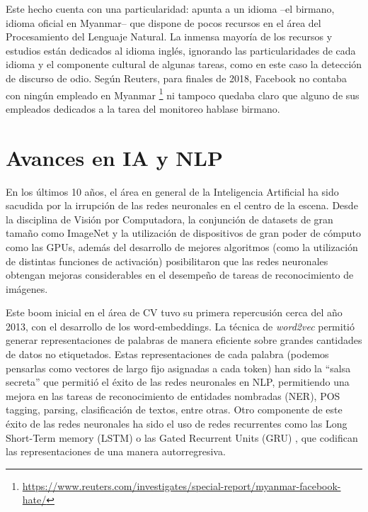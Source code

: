 Este hecho cuenta con una particularidad: apunta a un idioma --el birmano, idioma oficial en Myanmar-- que dispone de pocos recursos en el área del Procesamiento del Lenguaje Natural. La inmensa mayoría de los recursos y estudios están dedicados al idioma inglés, ignorando las particularidades de cada idioma y el componente cultural de algunas tareas, como en este caso la detección de discurso de odio. Según Reuters, para finales de 2018, Facebook no contaba con ningún empleado en Myanmar \footnote{\url{https://www.reuters.com/investigates/special-report/myanmar-facebook-hate/}} ni tampoco quedaba claro que alguno de sus empleados dedicados a la tarea del monitoreo hablase birmano.





\section{Avances en IA y NLP}

En los últimos 10 años, el área en general de la Inteligencia Artificial ha sido sacudida por la irrupción de las redes neuronales en el centro de la escena. Desde la disciplina de Visión por Computadora, la conjunción de datasets de gran tamaño como ImageNet \cite{imagenet2009deng} y la utilización de dispositivos de gran poder de cómputo como las GPUs, además del desarrollo de mejores algoritmos (como la utilización de distintas funciones de activación) posibilitaron que las redes neuronales obtengan mejoras considerables en el desempeño de tareas de reconocimiento de imágenes. 

Este boom inicial en el área de CV tuvo su primera repercusión cerca del año 2013, con el desarrollo de los word-embeddings. La técnica de \emph{word2vec}\cite{mikolov2013distributed} permitió generar representaciones de palabras de manera eficiente sobre grandes cantidades de datos no etiquetados. Estas representaciones de cada palabra (podemos pensarlas como vectores de largo fijo asignadas a cada token) han sido la ``salsa secreta'' que permitió el éxito de las redes neuronales en NLP, permitiendo una mejora en las tareas de reconocimiento de entidades nombradas (NER), POS tagging, parsing, clasificación de textos, entre otras. Otro componente de este éxito de las redes neuronales ha sido el uso de redes recurrentes como las Long Short-Term memory (LSTM) \cite{hochreiter1997long} o las Gated Recurrent Units (GRU) \cite{cho-etal-2014-learning}, que codifican las representaciones de una manera autorregresiva.


